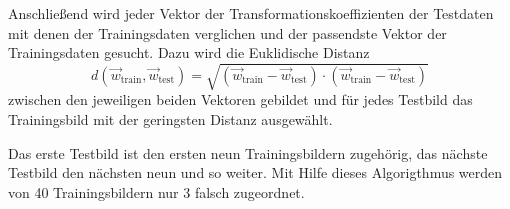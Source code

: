 Anschließend wird jeder Vektor der Transformationskoeffizienten der Testdaten mit denen
der Trainingsdaten verglichen und der passendste Vektor der Trainingsdaten gesucht.
Dazu wird die Euklidische Distanz
\begin{equation*}
  d\!\left(\vec{w}_\text{train}, \vec{w}_\text{test}\right) =
  \sqrt{\left(\vec{w}_\text{train} - \vec{w}_\text{test}\right) \cdot
  \left(\vec{w}_\text{train} - \vec{w}_\text{test}\right)}
\end{equation*}
zwischen den jeweiligen beiden Vektoren gebildet
und für jedes Testbild das Trainingsbild mit der geringsten Distanz ausgewählt.

Das erste Testbild ist den ersten neun Trainingsbildern zugehörig,
das nächste Testbild den nächsten neun und so weiter. Mit Hilfe dieses
Algorigthmus werden von 40 Trainingsbildern nur 3 falsch zugeordnet.
